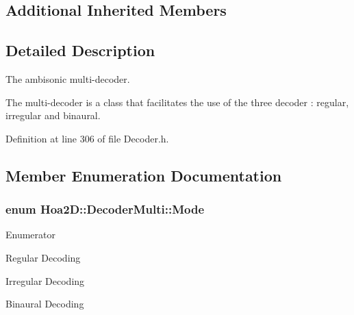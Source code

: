 \subsection*{Additional Inherited Members}


\subsection{Detailed Description}
The ambisonic multi-\/decoder. 

The multi-\/decoder is a class that facilitates the use of the three decoder \-: regular, irregular and binaural. 

Definition at line 306 of file Decoder.\-h.



\subsection{Member Enumeration Documentation}
\hypertarget{class_hoa2_d_1_1_decoder_multi_a0ac23d6bd77378d9cd5ddf6e71029300}{
\subsubsection[{Mode}]{\setlength{\rightskip}{0pt plus 5cm}enum {\bf Hoa2\-D\-::\-Decoder\-Multi\-::\-Mode}}}\label{class_hoa2_d_1_1_decoder_multi_a0ac23d6bd77378d9cd5ddf6e71029300}
\begin{Desc}
\item[Enumerator]\par
\begin{description}
\item[{\em 
\hypertarget{class_hoa2_d_1_1_decoder_multi_a0ac23d6bd77378d9cd5ddf6e71029300abaf1a2b64008b0199ced6e486911aed2}{Regular}\label{class_hoa2_d_1_1_decoder_multi_a0ac23d6bd77378d9cd5ddf6e71029300abaf1a2b64008b0199ced6e486911aed2}
}]Regular Decoding \item[{\em 
\hypertarget{class_hoa2_d_1_1_decoder_multi_a0ac23d6bd77378d9cd5ddf6e71029300afad959e312fd3402f086633b221008a3}{Irregular}\label{class_hoa2_d_1_1_decoder_multi_a0ac23d6bd77378d9cd5ddf6e71029300afad959e312fd3402f086633b221008a3}
}]Irregular Decoding \item[{\em 
\hypertarget{class_hoa2_d_1_1_decoder_multi_a0ac23d6bd77378d9cd5ddf6e71029300a1d1ea5f4bbb54e7062cf1c74e8ae2db0}{Binaural}\label{class_hoa2_d_1_1_decoder_multi_a0ac23d6bd77378d9cd5ddf6e71029300a1d1ea5f4bbb54e7062cf1c74e8ae2db0}
}]Binaural Decoding \end{description}
\end{Desc}


